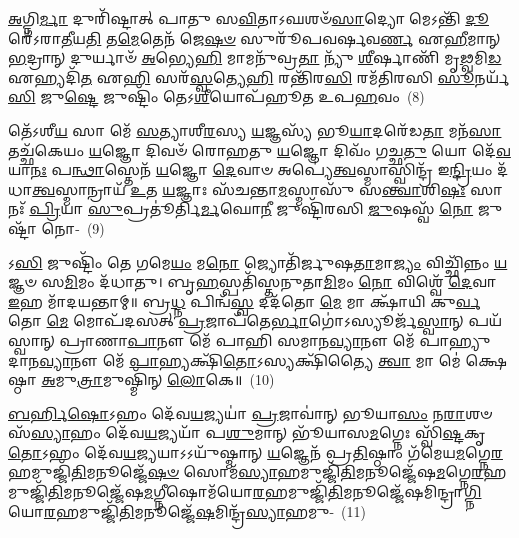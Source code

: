 {\anuvakamend[{𑌰𑌿𑌷𑍍𑌯𑌾॑𑌥𑍍𑌸𑌪\-\ul{𑌤𑍍𑌨}\-𑌕𑍍𑌷𑌯᳴𑌣𑍍𑌯\-\ul{𑌨𑍍𑌨𑌾}\-𑌦𑍋 𑌭𑍂᳴𑌯𑌾\-\ul{𑌸}\-\-\ul{𑍞} 𑌷𑌟𑍍𑌤𑍍𑌰𑌿𑍞᳴𑌶𑌚𑍍𑌚}]}%

\-\ul{𑌅}\-𑌗𑍍𑌨𑌿\-\ul{𑌰𑍍𑌮𑌾} 𑌦𑍁𑌰𑌿᳴𑌷𑍍𑌟𑌾𑌤𑍍 𑌪𑌾𑌤𑍁 𑌸\-\ul{𑌵𑌿}\-𑌤𑌾\-𑌽𑌘𑌶𑍞᳴\-\ul{𑌸𑌾}\-𑌦𑍍𑌯𑍋 𑌮𑍇\-𑌽𑌨𑍍𑌤𑌿᳴ \ul{𑌦𑍂}\-𑌰𑍇᳴\-𑌽𑌰𑌾\-\ul{𑌤𑍀}\-𑌯\-\ul{𑌤𑌿} 𑌤\-\ul{𑌮𑍇}\-𑌤𑍇𑌨᳴ 𑌜𑍇\-\ul{𑌷}\-\-\ul{𑍞} 𑌸𑍁𑌰𑍂᳴𑌪𑌵𑌰𑍍\mbox{}𑌷𑌵\-\ul{𑌰𑍍𑌣} 𑌏\-\ul{𑌹𑍀}\-𑌮𑌾𑌨𑍍 \ul{𑌭}\-𑌦𑍍𑌰𑌾𑌨𑍍 𑌦𑍁𑌰𑍍𑌯𑌾𑍞᳴ \ul{𑌅}\-𑌭𑍍𑌯𑍇\-\ul{𑌹𑌿} 𑌮𑌾𑌮𑌨𑍁᳴𑌵𑍍𑌰\-\ul{𑌤𑌾} 𑌨𑍍𑌯𑍁᳴ \ul{𑌶𑍀}\-𑌰𑍍\mbox{}𑌷𑌾𑌣𑌿᳴ 𑌮𑍃\-\ul{𑌢𑍍𑌵}\-𑌮𑌿\-\ul{𑌡} 𑌏𑌹𑍍𑌯𑌦𑌿᳴\-\ul{𑌤} 𑌏\-\ul{𑌹𑌿} 𑌸𑌰᳴\-\ul{𑌸𑍍𑌵}\-𑌤𑍍𑌯𑍇\-\ul{𑌹𑌿} 𑌰𑌨𑍍𑌤𑌿᳴𑌰\-\ul{𑌸𑌿} 𑌰𑌮᳴𑌤𑌿𑌰𑌸𑌿 \ul{𑌸𑍂}\-𑌨𑌰𑍍𑌯᳴\-\ul{𑌸𑌿} 𑌜𑍁\-\ul{𑌷𑍍𑌟𑍇} 𑌜𑍁𑌷𑍍𑌟𑌿𑌂᳴ 𑌤𑍇\-𑌽\-\ul{𑌶𑍀}\-𑌯𑍋𑌪᳴𑌹𑍂𑌤 𑌉𑌪\-\ul{𑌹}\-𑌵𑌂~(8)

𑌤𑍇᳴\-𑌽𑌶𑍀\-\ul{𑌯} 𑌸𑌾 𑌮𑍇᳴ \ul{𑌸}\-𑌤𑍍𑌯𑌾𑌶𑍀\-\ul{𑌰}\-𑌸𑍍𑌯 \ul{𑌯}\-𑌜𑍍𑌞𑌸𑍍𑌯᳴ 𑌭𑍂\-\ul{𑌯𑌾}\-𑌦𑌰𑍇᳴𑌡\-\ul{𑌤𑌾} 𑌮𑌨᳴\-\ul{𑌸𑌾} 𑌤𑌚𑍍𑌛᳴𑌕𑍇𑌯𑌂 \ul{𑌯}\-𑌜𑍍𑌞𑍋 𑌦𑌿𑌵𑍞᳴ 𑌰𑍋𑌹𑌤𑍁 \ul{𑌯}\-𑌜𑍍𑌞𑍋 𑌦𑌿𑌵𑌂᳴ 𑌗𑌚𑍍𑌛\-\ul{𑌤𑍁} 𑌯𑍋 𑌦𑍇᳴\-\ul{𑌵}\-𑌯𑌾\-\ul{𑌨𑌃} 𑌪\-\ul{𑌨𑍍𑌥𑌾}\-𑌸𑍍𑌤𑍇𑌨᳴ \ul{𑌯}\-𑌜𑍍𑌞𑍋 \ul{𑌦𑍇}\-𑌵𑌾𑍞 𑌅𑌪𑍍𑌯𑍇॑\-\ul{𑌤𑍍𑌵}\-𑌸𑍍𑌮𑌾𑌸𑍍𑌵𑌿𑌨𑍍𑌦𑍍𑌰᳴ 𑌇\-\ul{𑌨𑍍𑌦𑍍𑌰𑌿}\-𑌯𑌂 𑌦᳴𑌧𑌾\-\ul{𑌤𑍍𑌵}\-𑌸𑍍𑌮𑌾𑌨𑍍𑌰𑌾𑌯᳴ \ul{𑌉}\-𑌤 \ul{𑌯}\-𑌜𑍍𑌞𑌾𑌃 𑌸᳴𑌚𑌨𑍍𑌤𑌾\-\ul{𑌮}\-𑌸𑍍𑌮𑌾𑌸𑍁᳴ 𑌸\-\ul{𑌨𑍍𑌤𑍍𑌵𑌾}\-𑌶𑌿\-\ul{𑌷𑌃} 𑌸𑌾 𑌨𑌃᳴ \ul{𑌪𑍍𑌰𑌿}\-𑌯𑌾 \ul{𑌸𑍁}\-𑌪𑍍𑌰𑌤𑍂॑𑌰𑍍𑌤𑌿\-\ul{𑌰𑍍𑌮}\-𑌘𑍋\-\ul{𑌨𑍀} 𑌜𑍁𑌷𑍍𑌟𑌿᳴𑌰𑌸𑌿 \ul{𑌜𑍁}\-𑌷𑌸𑍍𑌵᳴ \ul{𑌨𑍋} 𑌜𑍁𑌷𑍍𑌟𑌾᳴ 𑌨𑍋-~(9)

𑌽\-\ul{𑌸𑌿} 𑌜𑍁𑌷𑍍𑌟𑌿𑌂᳴ 𑌤𑍇 𑌗𑌮𑍇\-\ul{𑌯𑌂} 𑌮\-\ul{𑌨𑍋} 𑌜𑍍𑌯𑍋𑌤𑌿᳴𑌰𑍍𑌜𑍁𑌷\-\ul{𑌤𑌾}\-𑌮𑌾\-\ul{𑌜𑍍𑌯𑌂} 𑌵𑌿𑌚𑍍𑌛𑌿᳴𑌨𑍍𑌨𑌂 \ul{𑌯}\-𑌜𑍍𑌞𑍞 𑌸\-\ul{𑌮𑌿}\-𑌮𑌂 𑌦᳴𑌧𑌾𑌤𑍁। 𑌬𑍃\-\ul{𑌹}\-𑌸𑍍𑌪𑌤𑌿᳴𑌸𑍍𑌤𑌨𑍁𑌤𑌾\-\ul{𑌮𑌿}\-𑌮𑌂 \ul{𑌨𑍋} 𑌵𑌿𑌶𑍍𑌵𑍇᳴ \ul{𑌦𑍇}\-𑌵𑌾 \ul{𑌇}\-𑌹 𑌮𑌾᳴𑌦𑌯𑌨𑍍𑌤𑌾𑌮𑍍॥ 𑌬𑍍𑌰\-\ul{𑌧𑍍𑌨} 𑌪𑌿𑌨𑍍𑌵᳴\-\ul{𑌸𑍍𑌵} 𑌦𑌦᳴𑌤𑍋 \ul{𑌮𑍇} 𑌮𑌾 𑌕𑍍𑌷𑌾᳴𑌯𑌿 𑌕𑍁\-\ul{𑌰𑍍𑌵}\-𑌤𑍋 \ul{𑌮𑍇} 𑌮𑍋𑌪᳴𑌦𑌸𑌤𑍍 \ul{𑌪𑍍𑌰}\-𑌜𑌾𑌪᳴𑌤𑍇\-\ul{𑌰𑍍𑌭𑌾}\-𑌗𑍋॑\-𑌽𑌸𑍍𑌯𑍂𑌰𑍍𑌜᳴\-\ul{𑌸𑍍𑌵𑌾}\-𑌨𑍍 𑌪𑌯᳴𑌸𑍍𑌵𑌾𑌨𑍍 𑌪𑍍𑌰𑌾𑌣𑌾\-\ul{𑌪𑌾}\-𑌨𑍗 𑌮𑍇᳴ 𑌪𑌾𑌹𑌿 𑌸𑌮𑌾𑌨\-\ul{𑌵𑍍𑌯𑌾}\-𑌨𑍗 𑌮𑍇᳴ 𑌪𑌾𑌹𑍍𑌯𑍁𑌦𑌾𑌨\-\ul{𑌵𑍍𑌯𑌾}\-𑌨𑍗 𑌮𑍇᳴ \ul{𑌪𑌾}\-𑌹𑍍𑌯𑌕𑍍𑌷𑌿᳴\-\ul{𑌤𑍋}\-\-𑌽𑌸𑍍𑌯𑌕𑍍𑌷𑌿᳴𑌤𑍍𑌯𑍈 \ul{𑌤𑍍𑌵𑌾} 𑌮𑌾 𑌮𑍇॑ 𑌕𑍍𑌷𑍇𑌷𑍍𑌠𑌾 \ul{𑌅}\-𑌮𑍁\-\ul{𑌤𑍍𑌰𑌾}\-𑌮𑍁𑌷𑍍𑌮𑌿᳴𑌨𑍍 \ul{𑌲𑍋}\-𑌕𑍇॥~(10)

{\anuvakamend[{\-\ul{𑌉}\-\-\ul{𑌪}\-\-\ul{𑌹}\-𑌵𑌂 𑌜𑍁𑌷𑍍𑌟𑌾᳴ 𑌨\-\ul{𑌸𑍍𑌤𑍍𑌵𑌾} 𑌷𑌟𑍍 𑌚᳴}]}%

\-\ul{𑌬}\-\-\ul{𑌰𑍍}\-\mbox{}𑌹𑌿\-\ul{𑌷𑍋}\-\-𑌽𑌹𑌂 𑌦𑍇᳴𑌵\-\ul{𑌯}\-𑌜𑍍𑌯𑌯𑌾॑ \ul{𑌪𑍍𑌰}\-𑌜𑌾𑌵𑌾॑𑌨𑍍 𑌭𑍂𑌯𑌾\-\ul{𑌸𑌂} 𑌨\-\ul{𑌰𑌾}\-𑌶𑍞𑌸᳴\-\ul{𑌸𑍍𑌯𑌾}\-𑌹𑌂 𑌦𑍇᳴𑌵\-\ul{𑌯}\-𑌜𑍍𑌯𑌯𑌾᳴ 𑌪\-\ul{𑌶𑍁}\-𑌮𑌾𑌨𑍍 𑌭𑍂᳴𑌯𑌾𑌸\-\ul{𑌮}\-𑌗𑍍𑌨𑍇𑌃 𑌸𑍍𑌵𑌿᳴\-\ul{𑌷𑍍𑌟}\-𑌕𑍃\-\ul{𑌤𑍋}\-\-𑌽𑌹𑌂 𑌦𑍇᳴𑌵\-\ul{𑌯}\-𑌜𑍍𑌯𑌯𑌾\-𑌽\-𑌽𑌯𑍁᳴𑌷𑍍𑌮𑌾𑌨𑍍 \ul{𑌯}\-𑌜𑍍𑌞𑍇𑌨᳴ 𑌪𑍍𑌰\-\ul{𑌤𑌿}\-𑌷𑍍𑌠𑌾𑌂 𑌗᳴𑌮𑍇𑌯\-\ul{𑌮}\-𑌗𑍍𑌨𑍇\-\ul{𑌰}\-𑌹𑌮𑍁𑌜𑍍𑌜𑌿᳴\-\ul{𑌤𑌿}\-𑌮𑌨𑍂𑌜𑍍𑌜𑍇᳴\-\ul{𑌷}\-\-\ul{𑍞} 𑌸𑍋𑌮᳴\-\-\ul{𑌸𑍍𑌯𑌾}\-\-𑌹𑌮𑍁𑌜𑍍𑌜𑌿᳴\-\ul{𑌤𑌿}\-\-𑌮𑌨𑍂𑌜𑍍𑌜𑍇᳴𑌷\-\ul{𑌮}\-𑌗𑍍𑌨𑍇\-\ul{𑌰}\-𑌹𑌮𑍁𑌜𑍍𑌜𑌿᳴\-\ul{𑌤𑌿}\-\-𑌮𑌨𑍂𑌜𑍍𑌜𑍇᳴𑌷\-\ul{𑌮}\-𑌗𑍍𑌨𑍀\-𑌷𑍋𑌮᳴𑌯𑍋\-\-\ul{𑌰}\-𑌹\-𑌮𑍁\-𑌜𑍍𑌜𑌿᳴\-\ul{𑌤𑌿}\-\-𑌮𑌨𑍂𑌜𑍍𑌜𑍇᳴𑌷\-𑌮𑌿𑌨𑍍𑌦𑍍𑌰𑌾\-\ul{𑌗𑍍𑌨𑌿}\-𑌯𑍋\-\-\ul{𑌰}\-𑌹𑌮𑍁𑌜𑍍𑌜𑌿᳴\-\ul{𑌤𑌿}\-\-𑌮𑌨𑍂𑌜𑍍𑌜𑍇᳴\-\ul{𑌷}\-\-𑌮𑌿𑌨𑍍𑌦𑍍𑌰᳴\-\ul{𑌸𑍍𑌯𑌾}\-𑌹𑌮𑍁-~(11)

